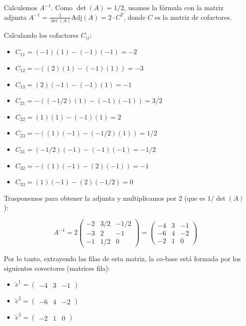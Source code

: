 \documentclass[11pt,spanish]{article}
\begin{document}
\begin{itemize}
Calculemos $A^{-1}$. Como $\det(A) = 1/2$, usamos la fórmula con la matriz adjunta $A^{-1} = \frac{1}{\det(A)} \text{Adj}(A) = 2 \cdot C^T$, donde $C$ es la matriz de cofactores.

Calculando los cofactores $C_{ij}$:

\begin{itemize}
\item $C_{11} = (-1)(1) - (-1)(-1) = -2$
\item $C_{12} = -((2)(1) - (-1)(1)) = -3$
\item $C_{13} = (2)(-1) - (-1)(1) = -1$
\item $C_{21} = -((-1/2)(1) - (-1)(-1)) = 3/2$
\item $C_{22} = (1)(1) - (-1)(1) = 2$
\item $C_{23} = -((1)(-1) - (-1/2)(1)) = 1/2$
\item $C_{31} = (-1/2)(-1) - (-1)(-1) = -1/2$
\item $C_{32} = -((1)(-1) - (2)(-1)) = -1$
\item $C_{33} = (1)(-1) - (2)(-1/2) = 0$
\end{itemize}

Trasponemos para obtener la adjunta y multiplicamos por $2$ (que es $1/\det(A)$):


$$A^{-1} = 2 \begin{pmatrix} -2 & 3/2 & -1/2 \\ -3 & 2 & -1 \\ -1 & 1/2 & 0 \end{pmatrix} = \begin{pmatrix} -4 & 3 & -1 \\ -6 & 4 & -2 \\ -2 & 1 & 0 \end{pmatrix}$$

Por lo tanto, extrayendo las filas de esta matriz, la co-base está formada por los siguientes covectores (matrices fila):

\begin{itemize}
\item $\tilde{e}^1 = \begin{pmatrix} -4 & 3 & -1 \end{pmatrix}$
\item $\tilde{e}^2 = \begin{pmatrix} -6 & 4 & -2 \end{pmatrix}$
\item $\tilde{e}^3 = \begin{pmatrix} -2 & 1 & 0 \end{pmatrix}$
\end{itemize}


\end{itemize}
\end{document}
